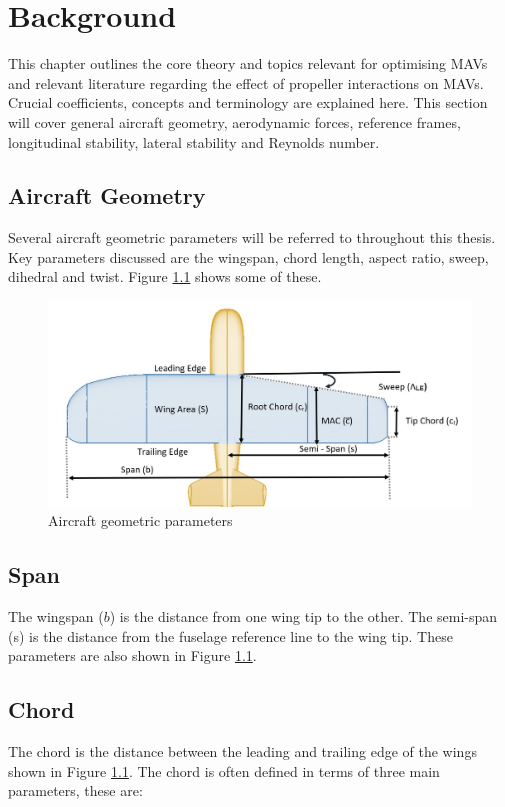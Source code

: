 
\graphicspath{{./Figs/}}

\chapter{Background} 
This chapter outlines the core theory and topics relevant for optimising MAVs and relevant literature regarding the effect of propeller interactions on MAVs. Crucial coefficients, concepts and terminology are explained here. This section will cover general aircraft geometry, aerodynamic forces, reference frames, longitudinal stability, lateral stability and Reynolds number. 

\section{Aircraft Geometry}
Several aircraft geometric parameters will be referred to throughout this thesis. Key parameters discussed are the wingspan, chord length, aspect ratio, sweep, dihedral and twist. Figure \ref{fig:aircraftgeometry} shows some of these.

\begin{figure}[H]
  \centering
   \includegraphics[width=1\linewidth]{03_LiteratureReview/Figs/geometry.JPG}
  \caption{Aircraft geometric parameters}
  \label{fig:aircraftgeometry}
\end{figure}

\section{Span}
The wingspan ($b$) is the distance from one wing tip to the other. The semi-span (s) is the distance from the fuselage reference line to the wing tip. These parameters are also shown in Figure \ref{fig:aircraftgeometry}. 

\section{Chord}
The chord is the distance between the leading and trailing edge of the wings shown in Figure \ref{fig:aircraftgeometry}. The chord is often defined in terms of three main parameters, these are:

